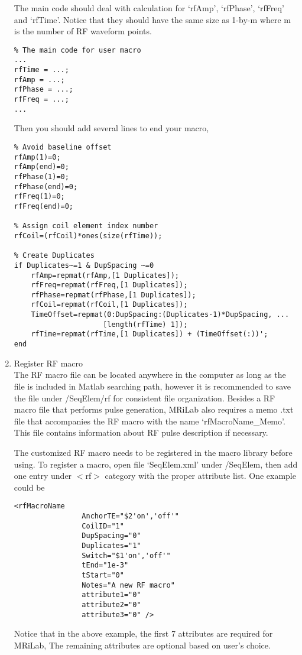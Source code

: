 \documentclass{book}%
\begin{document}
\begin{enumerate}
The main code should deal with calculation for `rfAmp', `rfPhase', `rfFreq' and `rfTime'. Notice that they should have the same size as 1-by-m where m is the number of RF waveform points.

\begin{verbatim}
% The main code for user macro
...
rfTime = ...;
rfAmp = ...;
rfPhase = ...;
rfFreq = ...;
...
\end{verbatim}


Then you should add several lines to end your macro,

\begin{verbatim}
% Avoid baseline offset
rfAmp(1)=0;
rfAmp(end)=0;
rfPhase(1)=0;
rfPhase(end)=0;
rfFreq(1)=0;
rfFreq(end)=0;

% Assign coil element index number
rfCoil=(rfCoil)*ones(size(rfTime));

% Create Duplicates
if Duplicates~=1 & DupSpacing ~=0
    rfAmp=repmat(rfAmp,[1 Duplicates]);
    rfFreq=repmat(rfFreq,[1 Duplicates]);
    rfPhase=repmat(rfPhase,[1 Duplicates]);
    rfCoil=repmat(rfCoil,[1 Duplicates]);
    TimeOffset=repmat(0:DupSpacing:(Duplicates-1)*DupSpacing, ... 
                     [length(rfTime) 1]);
    rfTime=repmat(rfTime,[1 Duplicates]) + (TimeOffset(:))';
end

\end{verbatim}

\item Register RF macro \\

The RF macro file can be located anywhere in the computer as long as the file is included in Matlab searching path, however it is recommended to save the file under /SeqElem/rf for consistent file organization. Besides a RF macro file that performs pulse generation, MRiLab also requires a memo .txt file that accompanies the RF macro with the name `rfMacroName\_Memo'. This file contains information about RF pulse description if necessary.

The customized RF macro needs to be registered in the macro library before using. To register a macro, open file `SeqElem.xml' under /SeqElem, then add one entry under $<$rf$>$ category with the proper attribute list. One example could be

\begin{verbatim}
<rfMacroName 
				AnchorTE="$2'on','off'" 
				CoilID="1" 
				DupSpacing="0" 
				Duplicates="1" 
				Switch="$1'on','off'" 
				tEnd="1e-3" 
				tStart="0" 
				Notes="A new RF macro" 
				attribute1="0" 
				attribute2="0" 
				attribute3="0" />
\end{verbatim}

Notice that in the above example, the first 7 attributes are required for MRiLab, The remaining attributes are optional based on user's choice.

\end{enumerate}
\end{document}
